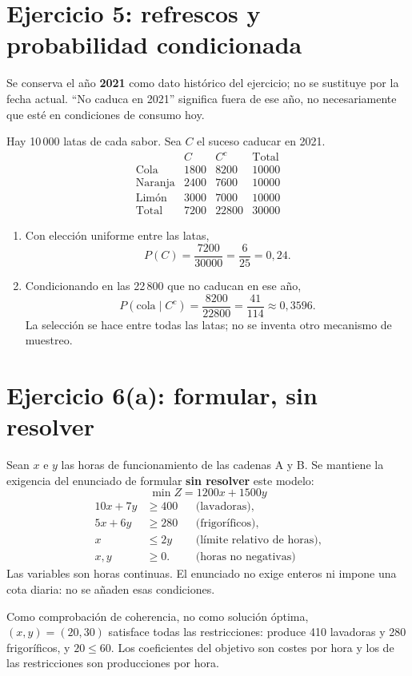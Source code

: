 \documentclass[11pt]{article}
\begin{document}
\section*{Ejercicio 5: refrescos y probabilidad condicionada}
Se conserva el año \textbf{2021} como dato histórico del ejercicio; no se sustituye por la fecha actual. ``No caduca en 2021'' significa fuera de ese año, no necesariamente que esté en condiciones de consumo hoy.

Hay 10\,000 latas de cada sabor. Sea $C$ el suceso caducar en 2021.
\[
\begin{array}{c|rr|r}
 &C&C^c&\text{Total}\\\hline
\text{Cola}&1800&8200&10000\\
\text{Naranja}&2400&7600&10000\\
\text{Limón}&3000&7000&10000\\\hline
\text{Total}&7200&22800&30000
\end{array}
\]
\begin{enumerate}[label=(\alph*)]
\item Con elección uniforme entre las latas,
\[
P(C)=\frac{7200}{30000}=\boxed{\frac6{25}=0,24}.
\]
\item Condicionando en las 22\,800 que no caducan en ese año,
\[
P(\text{cola}\mid C^c)=\frac{8200}{22800}
=\boxed{\frac{41}{114}}\approx0,3596.
\]
La selección se hace entre todas las latas; no se inventa otro mecanismo de muestreo.
\end{enumerate}
\clearpage
\section*{Ejercicio 6(a): formular, sin resolver}
Sean $x$ e $y$ las horas de funcionamiento de las cadenas A y B. Se mantiene la exigencia del enunciado de formular \textbf{sin resolver} este modelo:
\[
\boxed{\min Z=1200x+1500y}
\]
\[
\begin{aligned}
10x+7y&\geq400 &&\text{(lavadoras)},\\
5x+6y&\geq280 &&\text{(frigoríficos)},\\
x&\leq2y &&\text{(límite relativo de horas)},\\
x,y&\geq0. &&\text{(horas no negativas)}
\end{aligned}
\]
Las variables son horas continuas. El enunciado no exige enteros ni impone una cota diaria: no se añaden esas condiciones.

Como comprobación de coherencia, no como solución óptima, $(x,y)=(20,30)$ satisface todas las restricciones: produce 410 lavadoras y 280 frigoríficos, y $20\leq60$. Los coeficientes del objetivo son costes por hora y los de las restricciones son producciones por hora.
\clearpage
\end{document}
